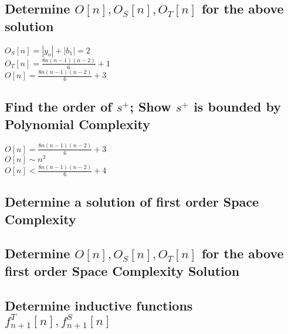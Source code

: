 \documentclass[11pt]{article}
\begin{document}
\subsection{Determine $O[n], O_S[n], O_T[n]$ for the above solution}
\begin{center}
$
O_S[n] = |y_o| + |b_1| = 2
$
\\ \vspace{2mm}
$
O_T[n] = \frac{8n(n-1)(n-2)}{6}+ 1
$
\\ \vspace{2mm}
$
O[n] = \frac{8n(n-1)(n-2)}{6}+ 3
$
\end{center}


\subsection{Find the order of $s^+$; Show $s^+$ is bounded by Polynomial Complexity}
\begin{center}
$
O[n] = \frac{8n(n-1)(n-2)}{6}+ 3
$
\\ \vspace{2mm}
$
O[n] \sim n^3
$
\\ \vspace{2mm}
$
O[n] < \frac{8n(n-1)(n-2)}{6} + 4
$
\end{center}







\subsection{Determine a solution of first order Space Complexity}
\begin{center}

\end{center}

\subsection{Determine $O[n], O_S[n], O_T[n]$ for the above first order Space Complexity Solution}
\begin{center}

\end{center}

\subsection{Determine inductive functions  $f^T_{n+1}[n],  f^S_{n+1}[n]$}
\begin{center}

\end{center}
\end{document}
